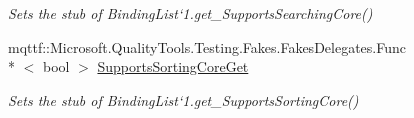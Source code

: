 \begin{DoxyCompactItemize}
\begin{DoxyCompactList}\small\item\em Sets the stub of Binding\-List`1.get\-\_\-\-Supports\-Searching\-Core()\end{DoxyCompactList}\item 
mqttf\-::\-Microsoft.\-Quality\-Tools.\-Testing.\-Fakes.\-Fakes\-Delegates.\-Func\\*
$<$ bool $>$ \hyperlink{class_system_1_1_component_model_1_1_fakes_1_1_stub_binding_list_3_01_t_01_4_a26e80504a925c7d8cb410b8ef59c50c0}{Supports\-Sorting\-Core\-Get}
\begin{DoxyCompactList}\small\item\em Sets the stub of Binding\-List`1.get\-\_\-\-Supports\-Sorting\-Core()\end{DoxyCompactList}\end{DoxyCompactItemize}
